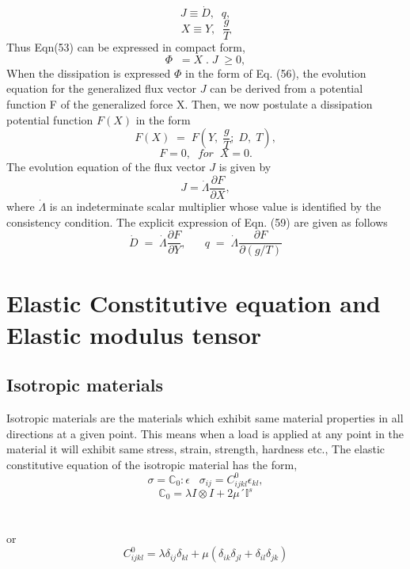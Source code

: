 \documentclass[a4paper,12pt]{article}
\begin{document}
\begin{equation}
J \equiv {\dot{D},\;\; q},
\end{equation}
\begin{equation}
X \equiv {Y,\;\; \frac{g}{T}}
\end{equation}
Thus Eqn(53) can be expressed in compact form,
\begin{equation}
\Phi\;\; = X\;.\;J \; \geq 0,
\end{equation}
When the dissipation is expressed $\Phi$ in the form of Eq. (56), the evolution equation for the generalized flux vector $J$ can be derived from a potential function F of the generalized force X. Then, we now postulate a dissipation potential function $F(X)$ in the form 
\begin{equation}
F(X) \; = \; F(Y, \; \frac{g}{T}; \; D, \; T),
\end{equation}
\begin{equation}
F = 0, \;\; for \;\; X = 0.
\end{equation}
The evolution equation of the flux vector $J$ is given by
\begin{equation}
J = \dot{\Lambda}\frac{\partial F}{\partial X},
\end{equation}
where $\dot{\Lambda}$ is an indeterminate scalar multiplier whose value is identified by the consistency condition. The explicit expression of Eqn. (59) are given as follows
\begin{equation}
\dot{D} \; = \; \dot{\Lambda}\frac{\partial F}{\partial Y}, \;\;\;\;\;\;  q\; = \; \dot{\Lambda}\frac{\partial F}{\partial (g/T)}
\end{equation}
\newpage 
\section{Elastic Constitutive equation and Elastic modulus tensor}
\subsection{Isotropic materials}
\indent\indent\indent Isotropic materials are the materials which exhibit same material properties in all directions at a given point. This means when a load is applied at any point in the material it will exhibit same stress, strain, strength, hardness etc., The elastic constitutive equation of the isotropic material has the form, 
\begin{equation}
  \sigma = \mathbb{C}_{0} : \epsilon   \;\;\;  \sigma_{ij}  =  C^{0}_{ijkl}\epsilon_{kl},
\end{equation}
\begin{equation}
\mathbb{C}_{0} =  \lambda I \otimes I  +  2\mu ´\mathbb{I}^{s}
\end{equation}\\
\\
or
\begin{equation}
C^{0}_{ijkl} = \lambda\delta_{ij}\delta_{kl}  +  \mu(\delta_{ik}\delta_{jl}+\delta_{il}\delta_{jk})
\end{equation}
\end{document}
